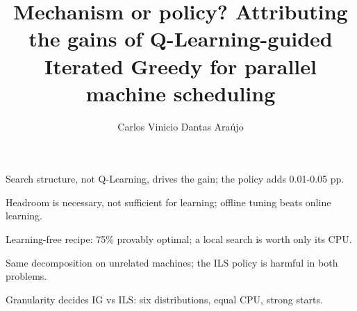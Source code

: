 \documentclass[final,3p,times,11pt,authoryear]{elsarticle}
\begin{document}
\begin{frontmatter}

\title{Mechanism or policy? Attributing the gains of Q-Learning-guided
       Iterated Greedy for parallel machine scheduling}

\author{Carlos Vinicio Dantas Araújo}
\address{Graduate Program in Computer Science, State University of Ceará
         (UECE), Fortaleza, CE, Brazil}

\begin{highlights}
\item Search structure, not Q-Learning, drives the gain; the policy adds 0.01-0.05 pp.
\item Headroom is necessary, not sufficient for learning; offline tuning beats online learning.
\item Learning-free recipe: 75\% provably optimal; a local search is worth only its CPU.
\item Same decomposition on unrelated machines; the ILS policy is harmful in both problems.
\item Granularity decides IG vs ILS: six distributions, equal CPU, strong starts.
\end{highlights}


\end{frontmatter}
\end{document}
